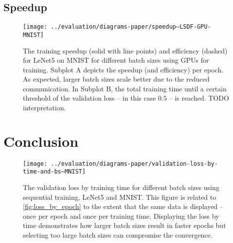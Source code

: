 \documentclass[conference,compsoc,a4paper]{IEEEtran}
\begin{document}

\subsection{Speedup} %
\label{sub:speedup}

\begin{figure*}[!t]
  \normalsize
  \centering
  \texttt{[image: ../evaluation/diagrams-paper/speedup--LSDF-GPU-MNIST]}
  \caption{The training speedup (solid with line points) and efficiency (dashed) for LeNet5 on MNIST for different batch sizes using GPUs for training.
  Subplot A depicts the speedup (and efficiency) per epoch.
  As expected, larger batch sizes scale better due to the reduced communication.
  In Subplot B, the total training time until a certain threshold of the validation loss -- in this case $0.5$ -- is reached.
  TODO interpretation.
  }
  \label{fig:speedup}
  \vspace*{4pt}
  \hrulefill
\end{figure*}



\section{Conclusion} %
\label{sec:conclusion}






\begin{figure}[!t]
\centering
\texttt{[image: ../evaluation/diagrams-paper/validation-loss-by-time-and-bs--MNIST]}
\caption{The validation loss by training time for different batch sizes using sequential training, LeNet5 and MNIST.
This figure is related to \autoref{fig:loss_by_epoch} to the extent that the same data is displayed -- once per epoch and once per training time.
Displaying the loss by time demonstrates how larger batch sizes result in faster epochs but selecting too large batch sizes can compromise the convergence.}
\label{fig:loss_by_time}
\end{figure}
\end{document}
